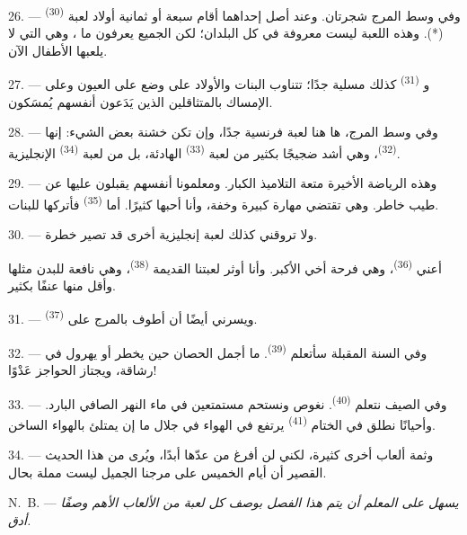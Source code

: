 26. --- وفي وسط المرج شجرتان. وعند أصل إحداهما أقام سبعة أو ثمانية أولاد
لعبة  \textsuperscript{(30)} (*). وهذه اللعبة ليست معروفة
في كل البلدان؛ لكن الجميع يعرفون ما ، وهي التي لا
يلعبها الأطفال الآن.

\VUsaut{5.0mm}
\VUsaut{3.4mm}

27. --- و \textsuperscript{(31)} كذلك مسلية جدًا؛ تتناوب
البنات والأولاد على وضع  على العيون وعلى الإمساك
بالمتثاقلين الذين يَدَعون أنفسهم يُمسَكون.

28. --- وفي وسط المرج، ها هنا لعبة فرنسية جدًا، وإن تكن خشنة بعض الشيء:
إنها  \textsuperscript{(32)}، وهي أشد ضجيجًا بكثير من لعبة
 \textsuperscript{(33)} الهادئة، بل من لعبة
 \textsuperscript{(34)} الإنجليزية.

29. --- وهذه الرياضة الأخيرة متعة التلاميذ الكبار. ومعلمونا أنفسهم
يقبلون عليها عن طيب خاطر. وهي تقتضي مهارة كبيرة وخفة، وأنا أحبها كثيرًا.
أما  \textsuperscript{(35)} فأتركها للبنات.

30. --- ولا تروقني كذلك لعبة إنجليزية أخرى قد تصير خطرة.

أعني  \textsuperscript{(36)}، وهي فرحة أخي الأكبر. وأنا
أوثر لعبتنا القديمة  \textsuperscript{(38)}، وهي نافعة للبدن
مثلها وأقل منها عنفًا بكثير.

\VUsaut{4.6mm}
\VUsaut{3.0mm}

31. --- ويسرني أيضًا أن أطوف بالمرج على  \textsuperscript{(37)}.

32. --- وفي السنة المقبلة سأتعلم  \textsuperscript{(39)}. ما
أجمل الحصان حين يخطر أو يهرول في رشاقة، ويجتاز الحواجز عَدْوًا!

33. --- وفي الصيف نتعلم  \textsuperscript{(40)}. نغوص ونستحم
مستمتعين في ماء النهر الصافي البارد. وأحيانًا نطلق في الختام
 \textsuperscript{(41)} يرتفع في الهواء في جلال ما إن
يمتلئ بالهواء الساخن.

34. --- وثمة ألعاب أخرى كثيرة، لكني لن أفرغ من عدّها أبدًا، ويُرى من هذا
الحديث القصير أن أيام الخميس على مرجنا الجميل ليست مملة بحال.

N.~B. --- \textit{يسهل على المعلم أن يتم هذا الفصل بوصف كل لعبة من
الألعاب الأهم وصفًا أدق.}
\VUsaut{6.0mm}
\VUfilet{22mm}
